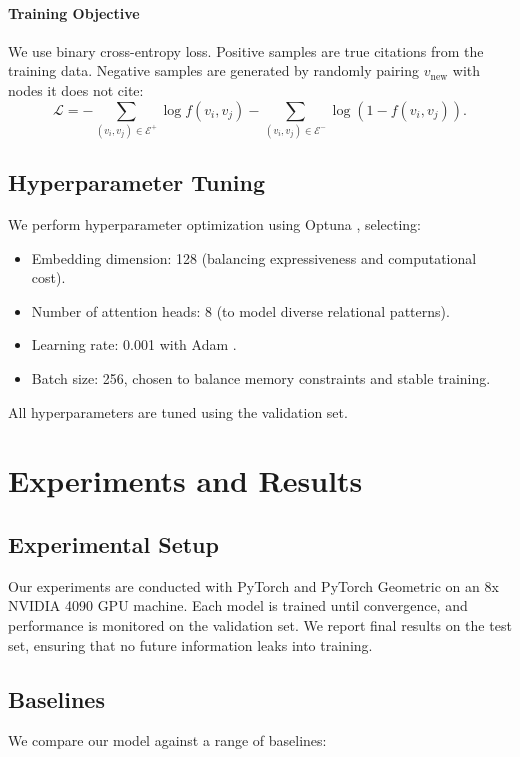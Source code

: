 \documentclass{article}
\begin{document}
\paragraph{Training Objective}
We use binary cross-entropy loss. Positive samples are true citations from the training data. Negative samples are generated by randomly pairing $v_{\text{new}}$ with nodes it does not cite:
\begin{equation}
\mathcal{L} = -\sum_{(v_i, v_j)\in\mathcal{E}^+}\log f(v_i,v_j) - \sum_{(v_i, v_j)\in\mathcal{E}^-}\log(1 - f(v_i,v_j)).
\end{equation}

\subsection{Hyperparameter Tuning}
We perform hyperparameter optimization using Optuna \citep{akiba2019optuna}, selecting:
\begin{itemize}[leftmargin=*]
    \item Embedding dimension: 128 (balancing expressiveness and computational cost).
    \item Number of attention heads: 8 (to model diverse relational patterns).
    \item Learning rate: 0.001 with Adam \citep{kingma2017adam}.
    \item Batch size: 256, chosen to balance memory constraints and stable training.
\end{itemize}

All hyperparameters are tuned using the validation set.

\section{Experiments and Results}
\subsection{Experimental Setup}
Our experiments are conducted with PyTorch and PyTorch Geometric \citep{fey2019fast} on an 8x NVIDIA 4090 GPU machine. Each model is trained until convergence, and performance is monitored on the validation set. We report final results on the test set, ensuring that no future information leaks into training.

\subsection{Baselines}
We compare our model against a range of baselines:
\end{document}
